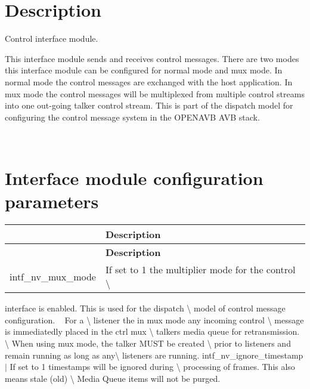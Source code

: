 \section*{Description}

Control interface module.

This interface module sends and receives control messages. There are two modes this interface module can be configured for normal mode and mux mode. In normal mode the control messages are exchanged with the host application. In mux mode the control messages will be multiplexed from multiple control streams into one out-\/going talker control stream. This is part of the dispatch model for configuring the control message system in the O\+P\+E\+N\+A\+VB A\+VB stack.

~\newline
 \section*{Interface module configuration parameters}

\tabulinesep=1mm
\begin{longtabu} spread 0pt [c]{*2{|X[-1]}|}
\hline
{}&{\bf Description  }\\
\endfirsthead
\hline
\endfoot
\hline
{}&{\bf Description  }\\
\endhead
intf\+\_\+nv\+\_\+mux\+\_\+mode &If set to 1 the multiplier mode for the control \textbackslash{} \\
\end{longtabu}
interface is enabled. This is used for the dispatch \textbackslash{} model of control message configuration. ~\newline
For a \textbackslash{} listener the in mux mode any incoming control \textbackslash{} message is immediatedly placed in the ctrl mux \textbackslash{} talkers media queue for retransmission.~\newline
 \textbackslash{} When using mux mode, the talker M\+U\+ST be created \textbackslash{} prior to listeners and remain running as long as any\textbackslash{} listeners are running. intf\+\_\+nv\+\_\+ignore\+\_\+timestamp $\vert$ If set to 1 timestamps will be ignored during \textbackslash{} processing of frames. This also means stale (old) \textbackslash{} Media Queue items will not be purged. 